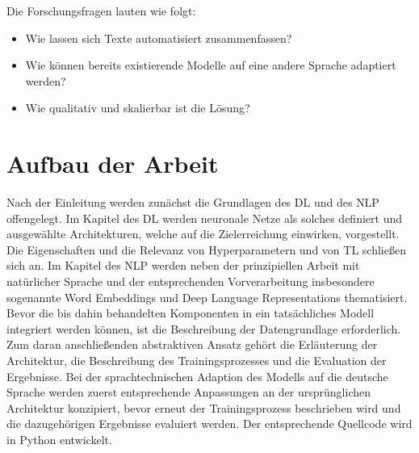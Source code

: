 Die Forschungsfragen lauten wie folgt:

\begin{itemize}
	\item Wie lassen sich Texte automatisiert zusammenfassen?
	\item Wie können bereits existierende Modelle auf eine andere Sprache adaptiert werden?
	\item Wie qualitativ und skalierbar ist die Lösung?
\end{itemize}


\section{Aufbau der Arbeit}
\noindent
Nach der Einleitung werden zunächst die Grundlagen des \ac{DL} und des \ac{NLP} offengelegt. Im Kapitel des \ac{DL} werden neuronale Netze als solches definiert und ausgewählte Architekturen, welche auf die Zielerreichung einwirken, vorgestellt. Die Eigenschaften und die Relevanz von Hyperparametern und von \ac{TL} schließen sich an. Im Kapitel des \ac{NLP} werden neben der prinzipiellen Arbeit mit natürlicher Sprache und der entsprechenden Vorverarbeitung insbesondere sogenannte Word Embeddings und Deep Language Representations thematisiert.\\

\noindent
Bevor die bis dahin behandelten Komponenten in ein tatsächliches Modell integriert werden können, ist die Beschreibung der Datengrundlage erforderlich. Zum daran anschließenden abstraktiven Ansatz gehört die Erläuterung der Architektur, die Beschreibung des Trainingsprozesses und die Evaluation der Ergebnisse. Bei der sprachtechnischen Adaption des Modells auf die deutsche Sprache werden zuerst entsprechende Anpassungen an der ursprünglichen Architektur konzipiert, bevor erneut der Trainingsprozess beschrieben wird und die dazugehörigen Ergebnisse evaluiert werden. Der entsprechende Quellcode wird in Python entwickelt.


